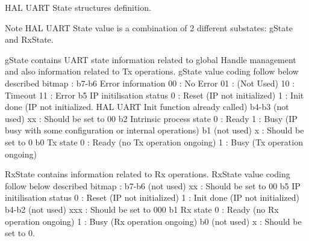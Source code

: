 H\+AL U\+A\+RT State structures definition. 

\begin{DoxyNote}{Note}
H\+AL U\+A\+RT State value is a combination of 2 different substates\+: g\+State and Rx\+State.
\begin{DoxyItemize}
\item g\+State contains U\+A\+RT state information related to global Handle management and also information related to Tx operations. g\+State value coding follow below described bitmap \+: b7-\/b6 Error information 00 \+: No Error 01 \+: (Not Used) 10 \+: Timeout 11 \+: Error b5 IP initilisation status 0 \+: Reset (IP not initialized) 1 \+: Init done (IP not initialized. H\+AL U\+A\+RT Init function already called) b4-\/b3 (not used) xx \+: Should be set to 00 b2 Intrinsic process state 0 \+: Ready 1 \+: Busy (IP busy with some configuration or internal operations) b1 (not used) x \+: Should be set to 0 b0 Tx state 0 \+: Ready (no Tx operation ongoing) 1 \+: Busy (Tx operation ongoing)
\item Rx\+State contains information related to Rx operations. Rx\+State value coding follow below described bitmap \+: b7-\/b6 (not used) xx \+: Should be set to 00 b5 IP initilisation status 0 \+: Reset (IP not initialized) 1 \+: Init done (IP not initialized) b4-\/b2 (not used) xxx \+: Should be set to 000 b1 Rx state 0 \+: Ready (no Rx operation ongoing) 1 \+: Busy (Rx operation ongoing) b0 (not used) x \+: Should be set to 0. 
\end{DoxyItemize}
\end{DoxyNote}
